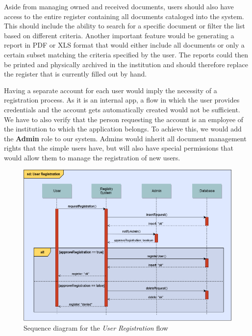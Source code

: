 Aside from managing owned and received documents, users should also have access to the entire register containing all documents cataloged into the system. This should include the ability to search for a specific document or filter the list based on different criteria. Another important feature would be generating a report in PDF or XLS format that would either include all documents or only a certain subset matching the criteria specified by the user. The reports could then be printed and physically archived in the institution and should therefore replace the register that is currently filled out by hand.

Having a separate account for each user would imply the necessity of a registration process. As it is an internal app, a flow in which the user provides credentials and the account gets automatically created would not be sufficient. We have to also verify that the person requesting the account is an employee of the institution to which the application belongs. To achieve this, we would add the \textbf{Admin} role to our system. Admins would inherit all document management rights that the simple users have, but will also have special permissions that would allow them to manage the registration of new users.

\begin{figure}[H]
    \centering
    \includegraphics[width=5in]{images/sequenceDiagram}
    \caption{Sequence diagram for the \textit{User Registration} flow}
    \label{sequenceDiagram}
\end{figure}

